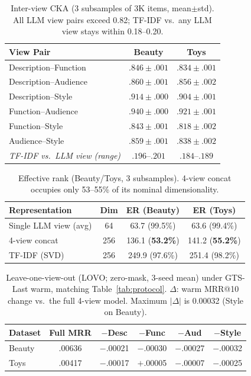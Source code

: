 \documentclass[sigconf,natbib=true,anonymous]{acmart}
\begin{document}
\begin{table}[t]
\centering
\caption{%
Inter-view CKA (3 subsamples of 3K items, mean$\pm$std).
All LLM view pairs exceed 0.82; TF-IDF vs.\ any LLM view stays within 0.18--0.20.%
}
\label{tab:cka}
\small
\setlength{\tabcolsep}{4pt}
\begin{tabular}{@{}lcc@{}}
\toprule
View Pair & Beauty & Toys \\
\midrule
Description--Function  & $.846 \pm .001$ & $.834 \pm .001$ \\
Description--Audience  & $.860 \pm .001$ & $.856 \pm .002$ \\
Description--Style     & $.914 \pm .000$ & $.904 \pm .001$ \\
Function--Audience     & $.940 \pm .000$ & $.921 \pm .001$ \\
Function--Style        & $.843 \pm .001$ & $.818 \pm .002$ \\
Audience--Style        & $.859 \pm .001$ & $.838 \pm .002$ \\
\midrule
\emph{TF-IDF vs.\ LLM view (range)} & $.196$--$.201$ & $.184$--$.189$ \\
\bottomrule
\end{tabular}
\end{table}

\begin{table}[t]
\centering
\caption{%
Effective rank (Beauty/Toys, 3 subsamples).
4-view concat occupies only 53--55\% of its nominal dimensionality.%
}
\label{tab:effrank}
\small
\begin{tabular}{@{}lccc@{}}
\toprule
Representation & Dim & ER (Beauty) & ER (Toys) \\
\midrule
Single LLM view (avg) & 64 & 63.7 (99.5\%) & 63.6 (99.4\%) \\
4-view concat & 256 & 136.1 (\textbf{53.2\%}) & 141.2 (\textbf{55.2\%}) \\
TF-IDF (SVD) & 256 & 249.9 (97.6\%) & 251.4 (98.2\%) \\
\bottomrule
\end{tabular}
\end{table}

\begin{table}[t]
\centering
\caption{%
Leave-one-view-out (LOVO; zero-mask, 3-seed mean) under GTS-Last warm, matching Table~\ref{tab:protocol}.
$\Delta$: warm MRR@10 change vs.\ the full 4-view model.
Maximum $|\Delta|$ is 0.00032 (Style on Beauty).%
}
\label{tab:lovo}
\small
\setlength{\tabcolsep}{3.5pt}
\begin{tabular}{@{}lccccc@{}}
\toprule
Dataset & Full MRR & $-$Desc & $-$Func & $-$Aud & $-$Style \\
\midrule
Beauty & .00636 & $-$.00021 & $-$.00030 & $-$.00027 & $-$.00032 \\
Toys   & .00417 & $-$.00017 & $+$.00005 & $-$.00007 & $-$.00025 \\
\bottomrule
\end{tabular}
\end{table}
\end{document}
